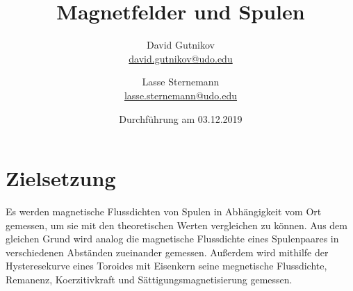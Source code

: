 \documentclass[titlepage = firstcover]{scrartcl}
\title{Magnetfelder und Spulen}
\author{
  David Gutnikov\\
  \href{mailto:david.gutnikov@udo.edu}{david.gutnikov@udo.edu}
 \and 
  Lasse Sternemann\\
  \href{mailto:lasse.sternemann@udo.edu}{lasse.sternemann@udo.edu}
}
\date{Durchführung am 03.12.2019}
\begin{document}
    \maketitle
    \newpage
    \tableofcontents
    \newpage

    \section{Zielsetzung}
      Es werden magnetische Flussdichten von Spulen in Abhängigkeit vom Ort gemessen, um sie mit den theoretischen Werten vergleichen zu können. Aus dem
      gleichen Grund wird analog die magnetische Flussdichte eines Spulenpaares in verschiedenen Abständen zueinander gemessen. Außerdem wird mithilfe der
      Hysteresekurve eines Toroides mit Eisenkern seine megnetische Flussdichte, Remanenz, Koerzitivkraft und Sättigungsmagnetisierung gemessen.
\end{document}
